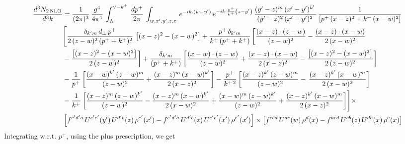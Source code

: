 \documentclass[9pt]{article}
\numberwithin{equation}{section}
\begin{document}
\begin{align}
 \frac{d^{3}N_{2\,\rm NLO}}{d^{3}k} & =  \frac{1}{(2\pi)^{3}}\,\frac{g^{4}}{4\pi^{4}}\,\int_{\Lambda}^{\vee-k^{+}}\, \frac{dp^{+}}{2\pi}\,\int_{w,x',y',z,x}\, e^{-ik\cdot (w-y')}\,e^{-ik\cdot \frac{p^{+}}{k^{+}}\left(z-y'\right)}\, \frac{(y'-z)^{m}\,(x'-y')^{k'}\,}{(y'-z)^{2}\,(x'-y')^{2}\,}\, \frac{1}{\left[p^{+}\,(x-z)^{2}+k^{+}\,(x-w)^{2}\right]}\notag \\ & \Bigg[\frac{\delta_{k'm}\,d_{\perp}\,p^{+}}{2\,(z-w)^{2}\,(p^{+}+k^{+})^{2}}\, \left[(x-z)^{2}-(x-w)^{2}\right]+\frac{p^{+}\,\delta_{k'm}}{k^{+}\,(p^{+}+k^{+})}\,\bigg[\frac{(x-z)\cdot (z-w)}{(z-w)^{2}} -\frac{(x-z)\cdot (x-w)}{2\,(x-w)^{2}}\notag \\ & -\frac{\left[(x-z)^{2}-(x-w)^{2}\right]}{2\,(z-w)^{2}}\bigg] +\frac{\delta_{k'm}}{(p^{+}+k^{+})}\,\bigg[\frac{(x-w)\cdot (z-w)}{(z-w)^{2}}+\frac{(x-z)\cdot (x-w)}{2\,(x-z)^{2}} -\frac{\left[(x-z)^{2}-(x-w)^{2}\right]}{2\,(z-w)^{2}}\bigg]\notag \\ & -\frac{1}{p^{+}}\,\bigg[\frac{(x-w)^{k'}\,(z-w)^{m}}{(z-w)^{2}}+\frac{(x-z)^{m}\,(x-w)^{k'}}{2\,(x-z)^{2}}\bigg]-\frac{p^{+}}{k^{+\,2}}\,\bigg[\frac{(x-z)^{k'}\,(z-w)^{m}}{(z-w)^{2}} -\,\frac{(x-z)^{k'}\,(x-w)^{m}}{2\,(x-w)^{2}}\bigg]\notag \\ & -\frac{1}{k^{+}}\,\bigg[\frac{(x-z)^{m}\,(z-w)^{k'}}{(z-w)^{2}}-\frac{(x-z)^{m}\,(x-w)^{k'}}{2\,(x-w)^{2}}+\frac{(x-w)^{m}\,(z-w)^{k'}}{(z-w)^{2}} +\frac{(x-z)^{k'}\,(x-w)^{m}}{2\,(x-z)^{2}}\bigg]\Bigg]\times\,\notag \\ & \left[f^{c'd'a}\,U^{c'e'}(y')\,U^{d'b}(z)\,\rho^{e'}(x')-f^{c'd'a}\, 
    U^{d'b}(z)\,U^{c'e'}(x')\,\rho^{e'}(x')\right]\times \left[f^{cbd}\,U^{ac}(w)\,\rho^{d}(x) -f^{acd}\,U^{cb}(z)\,U^{de}(x)\,\rho^{e}(x)\right]
\end{align}
Integrating w.r.t. $p^{+}$, using the plus prescription, we get
\end{document}
